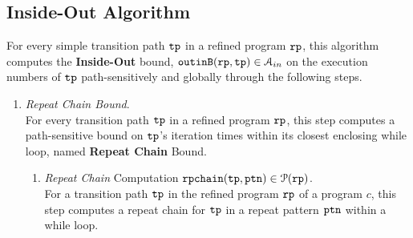 \subsection{Inside-Out Algorithm}
\label{sec:inoutalg}
For every simple transition path $\mathtt{tp}$ in a refined program $\mathtt{rp}$, 
this algorithm
computes the \textbf{Inside-Out} bound, $\mathtt{outinB}(\mathtt{rp}, \mathtt{tp}) \in \mathcal{A}_{in}$
on the execution numbers of $\mathtt{tp}$ path-sensitively and globally
through the following steps.

%
\begin{enumerate}
  \item \emph{Repeat Chain Bound}.
  \\
  For every transition path $\mathtt{tp}$ in a refined program $\mathtt{rp}$,
  this step computes a path-sensitive
  bound on $\mathtt{tp}$'s iteration times within its closest enclosing while loop, named \textbf{Repeat Chain} Bound.
  \begin{enumerate}
\item \emph{Repeat Chain} Computation $\mathtt{rpchain}(\mathtt{tp}, \mathtt{ptn}) \in \mathcal{P}(\mathtt{rp})$.
\\
For a transition path $\mathtt{tp}$ in the refined program $\mathtt{rp}$ of a program $c$, 
this step computes a repeat chain for $\mathtt{tp}$ in a repeat pattern $\mathtt{ptn}$
within a while loop.

\end{enumerate}
\end{enumerate}
